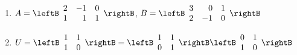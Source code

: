 \begin{multicols}{2}
\begin{ex}
\begin{enumerate}[label={\alph*.}]
\item $A = \leftB \begin{array}{rrr}
2 & -1 & 0 \\
1 & 1 & 1
\end{array} \rightB$, 
$B = \leftB \begin{array}{rrr}
3 & 0 & 1 \\
2 & -1 & 0
\end{array} \rightB$

\end{enumerate}
\begin{sol}
\begin{enumerate}[label={\alph*.}]
\setcounter{enumi}{1}
\item $U = \leftB \begin{array}{rr}
1 & 1 \\
1 & 0
\end{array} \rightB = \leftB \begin{array}{rr}
1 & 1 \\
0 & 1
\end{array} \rightB \leftB \begin{array}{rr}
0 & 1 \\
1 & 0
\end{array} \rightB$

\end{enumerate}
\end{sol}
\end{ex}



\end{multicols}
